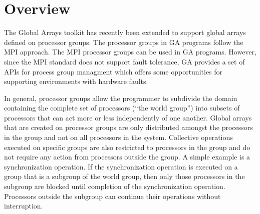 
\section{Overview}

The Global Arrays toolkit has recently been extended to support global
arrays defined on processor groups. The processor groups in GA programs
follow the MPI approach. The MPI processor groups can be used in GA
programs. However, since the MPI standard does not support fault tolerance,
GA provides a set of APIs for process group managment which offers
some opportunities for supporting environments with hardware faults.

In general, processor groups allow the programmer to subdivide the
domain containing the complete set of processors (\textquotedblleft{}the
world group\textquotedblright{}) into subsets of processors that can
act more or less independently of one another. Global arrays that
are created on processor groups are only distributed amongst the processors
in the group and not on all processors in the system. Collective operations
executed on specific groups are also restricted to processors in the
group and do not require any action from processors outside the group.
A simple example is a synchronization operation. If the synchronization
operation is executed on a group that is a subgroup of the world group,
then only those processors in the subgroup are blocked until completion
of the synchronization operation. Processors outside the subgroup
can continue their operations without interruption.

